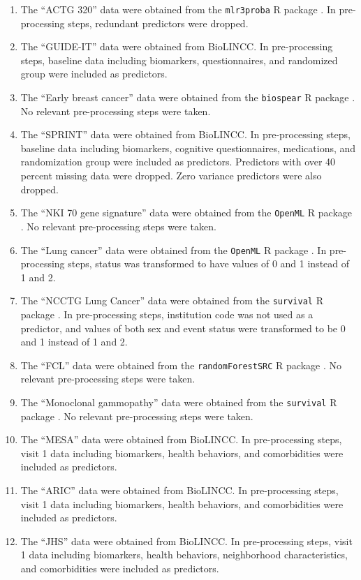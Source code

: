 \documentclass[12pt]{article}\usepackage[]{graphicx}\usepackage[]{xcolor}
\begin{document}
\begin{enumerate}
 \item The ``ACTG 320'' data \citep{hosmer2002applied} were obtained from the \texttt{mlr3proba} R package \citep{mlr3proba}. In pre-processing steps, redundant predictors were dropped. 
 \item The ``GUIDE-IT'' data \citep{felker2017effect} were obtained from BioLINCC. In pre-processing steps, baseline data including biomarkers, questionnaires, and randomized group were included as predictors. 
 \item The ``Early breast cancer'' data \citep{desmedt2011multifactorial, hatzis2011genomic, ternes2017identification} were obtained from the \texttt{biospear} R package \citep{biospear}. No relevant pre-processing steps were taken. 
 \item The ``SPRINT'' data \citep{sprint2015randomized} were obtained from BioLINCC. In pre-processing steps, baseline data including biomarkers, cognitive questionnaires, medications, and randomization group were included as predictors. Predictors with over 40 percent missing data were dropped. Zero variance predictors were also dropped. 
 \item The ``NKI 70 gene signature'' data \citep{van2002gene} were obtained from the \texttt{OpenML} R package \citep{OpenML}. No relevant pre-processing steps were taken. 
 \item The ``Lung cancer'' data \citep{director2008gene} were obtained from the \texttt{OpenML} R package \citep{OpenML}. In pre-processing steps, status was transformed to have values of 0 and 1 instead of 1 and 2. 
 \item The ``NCCTG Lung Cancer'' data \citep{loprinzi1994prospective} were obtained from the \texttt{survival} R package \citep{survival}. In pre-processing steps, institution code was not used as a predictor, and values of both sex and event status were transformed to be 0 and 1 instead of 1 and 2. 
 \item The ``FCL'' data \citep{pintilie2006competing} were obtained from the \texttt{randomForestSRC} R package \citep{randomForestSRC}. No relevant pre-processing steps were taken. 
 \item The ``Monoclonal gammopathy'' data \citep{kyle2002long} were obtained from the \texttt{survival} R package \citep{survival}. No relevant pre-processing steps were taken. 
 \item The ``MESA'' data \citep{bild2002multi} were obtained from BioLINCC. In pre-processing steps, visit 1 data including biomarkers, health behaviors, and comorbidities were included as predictors. 
 \item The ``ARIC'' data \citep{aric1989atherosclerosis} were obtained from BioLINCC. In pre-processing steps, visit 1 data including biomarkers, health behaviors, and comorbidities were included as predictors. 
 \item The ``JHS'' data \citep{taylor2005toward} were obtained from BioLINCC. In pre-processing steps, visit 1 data including biomarkers, health behaviors, neighborhood characteristics, and comorbidities were included as predictors.

\end{enumerate}
\end{document}
